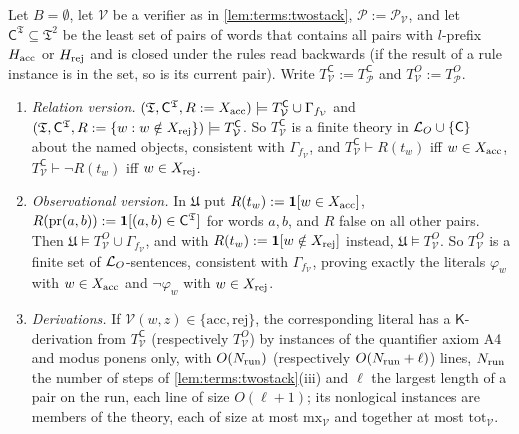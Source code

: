 \begin{theorem}\label{thm:terms:binary}
Let $B=\emptyset$, let $\mathcal V$ be a verifier as in \cref{lem:terms:twostack}, $\mathcal P:=\mathcal P_{\mathcal V}$, and let $\mathsf C^{\mathfrak T}\subseteq\mathfrak T^2$ be the least set of pairs of words that contains all pairs with $l$-prefix $H_{\rm acc}$ or $H_{\rm rej}$ and is closed under the rules read backwards (if the result of a rule instance is in the set, so is its current pair). Write $T^{\mathsf C}_{\mathcal V}:=T^{\mathsf C}_{\mathcal P}$ and $T^O_{\mathcal V}:=T^O_{\mathcal P}$.
\begin{enumerate}[label=(\roman*),leftmargin=*]
\item \emph{Relation version.} $(\mathfrak T,\mathsf C^{\mathfrak T},R:=X_{\rm acc})\models T^{\mathsf C}_{\mathcal V}\cup\Gamma_{f_{\mathcal V}}$ and $(\mathfrak T,\mathsf C^{\mathfrak T},R:=\{w:w\notin X_{\rm rej}\})\models T^{\mathsf C}_{\mathcal V}$. So $T^{\mathsf C}_{\mathcal V}$ is a finite theory in $\mathcal{L}_{O}\cup\{\mathsf C\}$ about the named objects, consistent with $\Gamma_{f_{\mathcal V}}$, and $T^{\mathsf C}_{\mathcal V}\vdash R(t_w)$ iff $w\in X_{\rm acc}$, $T^{\mathsf C}_{\mathcal V}\vdash\neg R(t_w)$ iff $w\in X_{\rm rej}$.
\item \emph{Observational version.} In $\mathfrak U$ put $R(t_w):=\mathbf{1}[w\in X_{\rm acc}]$, $R(\mathrm{pr}(a,b)):=\mathbf{1}[(a,b)\in\mathsf C^{\mathfrak T}]$ for words $a,b$, and $R$ false on all other pairs. Then $\mathfrak U\models T^O_{\mathcal V}\cup\Gamma_{f_{\mathcal V}}$, and with $R(t_w):=\mathbf{1}[w\notin X_{\rm rej}]$ instead, $\mathfrak U\models T^O_{\mathcal V}$. So $T^O_{\mathcal V}$ is a finite set of $\mathcal{L}_{O}$-sentences, consistent with $\Gamma_{f_{\mathcal V}}$, proving exactly the literals $\varphi_w$ with $w\in X_{\rm acc}$ and $\neg\varphi_w$ with $w\in X_{\rm rej}$.
\item \emph{Derivations.} If $\mathcal V(w,z)\in\{\mathrm{acc},\mathrm{rej}\}$, the corresponding literal has a $\mathsf K$-derivation from $T^{\mathsf C}_{\mathcal V}$ (respectively $T^O_{\mathcal V}$) by instances of the quantifier axiom A4 and modus ponens only, with $O(N_{\rm run})$ (respectively $O(N_{\rm run}+\ell)$) lines, $N_{\rm run}$ the number of steps of \cref{lem:terms:twostack}(iii) and $\ell$ the largest length of a pair on the run, each line of size $O(\ell+1)$; its nonlogical instances are members of the theory, each of size at most $\mathrm{mx}_{\mathcal V}$ and together at most $\mathrm{tot}_{\mathcal V}$.

\end{enumerate}
\end{theorem}
